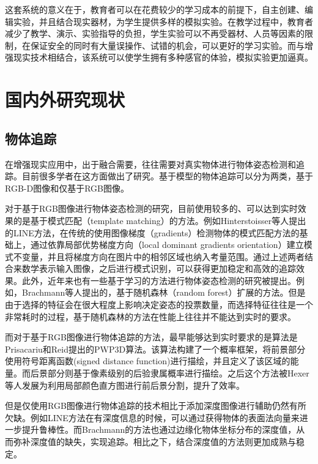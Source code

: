 这套系统的意义在于，教育者可以在花费较少的学习成本的前提下，自主创建、编辑实验，并且结合现实器材，为学生提供多样的模拟实验。在教学过程中，教育者减少了教学、演示、实验指导的负担，学生实验可以不再受器材、人员等因素的限制，在保证安全的同时有大量误操作、试错的机会，可以更好的学习实验。而与增强现实技术相结合，该系统可以使学生拥有多种感官的体验，模拟实验更加逼真。


\section{国内外研究现状}
\subsection{物体追踪}
在增强现实应用中，出于融合需要，往往需要对真实物体进行物体姿态检测和追踪。目前很多学者在这方面做出了研究。基于模型的物体追踪可以分为两类，基于RGB-D图像和仅基于RGB图像。

对于基于RGB图像进行物体姿态检测的研究，目前使用较多的、可以达到实时效果的是基于模式匹配（template matching）的方法。例如Hinterstoisser等人提出的LINE方法\cite{hinterstoisser2011gradient}，在传统的使用图像梯度（gradients）检测物体的模式匹配方法的基础上，通过依靠局部优势梯度方向（local dominant gradients orientation）建立模式不变量，并且将梯度方向在图片中的相邻区域也纳入考量范围。通过上述两者结合来数学表示输入图像，之后进行模式识别，可以获得更加稳定和高效的追踪效果。此外，近年来也有一些基于学习的方法进行物体姿态检测的研究被提出。例如，Brachmann等人提出的，基于随机森林（random forest）扩展的方法。\cite{brachmann2016uncertainty}但是由于选择的特征会在很大程度上影响决定姿态的投票数量，而选择特征往往是一个非常耗时的过程，基于随机森林的方法在性能上往往并不能达到实时的要求。

而对于基于RGB图像进行物体追踪的方法，最早能够达到实时要求的是算法是Prisacariu和Reid提出的PWP3D算法\cite{prisacariu2012pwp3d}。该算法构建了一个概率框架，将前景部分使用符号距离函数(signed distance function)进行描绘，并且定义了该区域的能量。而后景部分则基于像素级别的后验隶属概率进行描绘。之后这个方法被Hexer等人发展为利用局部颜色直方图进行前后景分割，提升了效率。\cite{hexner20162d}

但是仅使用RGB图像进行物体追踪的技术相比于添加深度图像进行辅助仍然有所欠缺。例如LINE方法\cite{hinterstoisser2011gradient}在有深度信息的时候，可以通过获得物体的表面法向量来进一步提升鲁棒性。而Brachmann的方法\cite{brachmann2016uncertainty}也通过边缘化物体坐标分布的深度值，从而弥补深度值的缺失，实现追踪。相比之下，结合深度值的方法则更加成熟与稳定。

